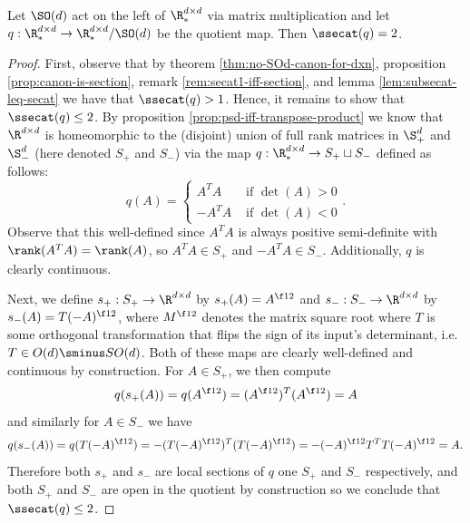 \begin{proposition}\label{prop:SOd-secat-2}
    Let $\SO(d)$ act on the left of $\R^{d \times d}_*$ via matrix multiplication and let $q : \R^{d \times d}_* \to \R^{d \times d}_* / \SO(d)$ be the quotient map.
    Then $\ssecat(q) = 2$.
    \begin{proof}
        First, observe that by theorem \ref{thm:no-SOd-canon-for-dxn}, proposition \ref{prop:canon-is-section}, remark \ref{rem:secat1-iff-section}, and lemma \ref{lem:subsecat-leq-secat} we have that $\ssecat(q) > 1$.
        Hence, it remains to show that $\ssecat(q) \leq 2$.
        By proposition \ref{prop:psd-iff-transpose-product} we know that $\R^{d \times d}$ is homeomorphic to the (disjoint) union of full rank matrices in $\S^d_+$ and $\S^d_-$ (here denoted $S_+$ and $S_-$) via the map $q : \R^{d \times d}_* \to S_+ \sqcup S_-$ defined as follows:
        \[
            q(A) = 
            \begin{cases}
                A^T A &\text{ if } \det(A) > 0 \\
                -A^T A &\text{ if } \det(A) < 0
            \end{cases}.
        \]
        Observe that this well-defined since $A^T A$ is always positive semi-definite with $\rank(A^T A) = \rank(A)$, so $A^T A \in S_+$ and $-A^T A \in S_-$.
        Additionally, $q$ is clearly continuous.

        Next, we define $s_+ : S_+ \to \R^{d \times d}$ by $s_+(A) = A^{\f12}$ and $s_- : S_- \to \R^{d \times d}$ by $s_-(A) = T(-A)^{\f12}$, where $M^{\f12}$ denotes the matrix square root where $T$ is some orthogonal transformation that flips the sign of its input's determinant, i.e. $T \in O(d) \sminus SO(d)$.
        Both of these maps are clearly well-defined and continuous by construction.
        For $A \in S_+$, we then compute
        \[
            q(s_+(A))
            = q(A^{\f12})
            = (A^{\f12})^T (A^{\f12})
            = A
        \]
        and similarly for $A \in S_-$ we have
        \[
            q(s_-(A))
            = q(T(-A)^{\f12})
            = -(T(-A)^{\f12})^T (T(-A)^{\f12})
            = -(-A)^{\f12} T^T T (-A)^{\f12}
            = A.
        \]
        Therefore both $s_+$ and $s_-$ are local sections of $q$ one $S_+$ and $S_-$ respectively, and both $S_+$ and $S_-$ are open in the quotient by construction so we conclude that $\ssecat(q) \leq 2$.
    \end{proof}
\end{proposition}

